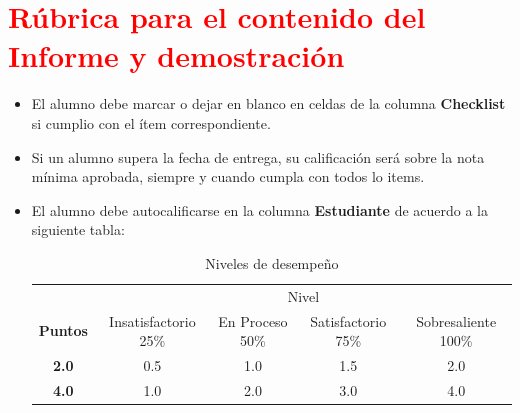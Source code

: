 \documentclass{article}
\begin{document}
	\section{\textcolor{red}{Rúbrica para el contenido del Informe y demostración}}
	\begin{itemize}			
		\item El alumno debe marcar o dejar en blanco en celdas de la columna \textbf{Checklist} si cumplio con el ítem correspondiente.
		\item Si un alumno supera la fecha de entrega,  su calificación será sobre la nota mínima aprobada, siempre y cuando cumpla con todos lo items.
		\item El alumno debe autocalificarse en la columna \textbf{Estudiante} de acuerdo a la siguiente tabla:
	
		\begin{table}[ht]
			\caption{Niveles de desempeño}
			\begin{center}
			\begin{tabular}{ccccc}
    			\hline
    			 & \multicolumn{4}{c}{Nivel}\\
    			\cline{1-5}
    			\textbf{Puntos} & Insatisfactorio 25\%& En Proceso 50\% & Satisfactorio 75\% & Sobresaliente 100\%\\
    			\textbf{2.0}&0.5&1.0&1.5&2.0\\
    			\textbf{4.0}&1.0&2.0&3.0&4.0\\
    		\hline
			\end{tabular}
		\end{center}
	\end{table}	
	
	\end{itemize}
	
\end{document}
